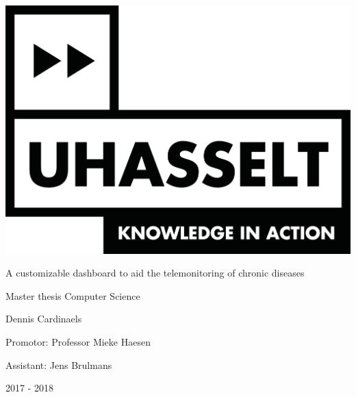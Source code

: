 
\begin{titlepage}
    \centering
    
    
    \includegraphics[scale=0.5]{chapters/title_page/logo_uhasselt}		
    \vspace{1cm}
    
    \Huge A customizable dashboard to aid the telemonitoring of chronic diseases
    \vspace{0.4cm}
    
    \large Master thesis Computer Science
    \vspace{1cm}
    
    \LARGE Dennis Cardinaels
    \vspace{1cm}
    
    \large Promotor: Professor Mieke Haesen
    \vspace{0.2cm}
    
    Assistant: Jens Brulmans
    
    \vspace{1.2cm}
    
    
    \Large 2017 - 2018
    
\end{titlepage}